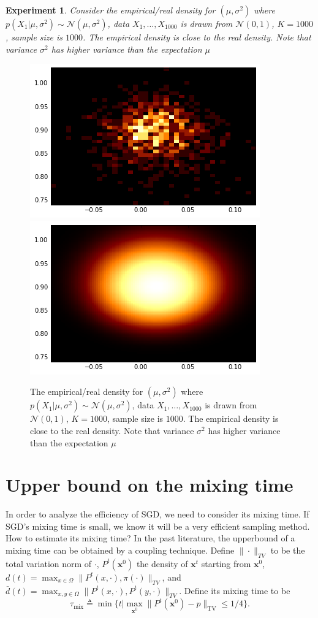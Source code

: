 \documentclass[preprint,12pt,3p]{elsarticle}
\newcommand{\bx}{\mathbf{x}}
\newcommand{\N}{\mathscr{N}}
\newtheorem{experiment}{Experiment}
\begin{document}
\begin{experiment}
Consider the empirical/real density for $(\mu, \sigma^2)$ where $p(X_1|\mu, \sigma^2)\sim \N(\mu, \sigma^2)$, data $X_1,\ldots, X_{1000}$ is drawn from $\N(0, 1)$, $K = 1000$, sample size is $1000$. The empirical density is close to the real density. Note that variance $\sigma^2$ has higher variance than the expectation $\mu$
\end{experiment}
\begin{figure}
\includegraphics[width=0.5\linewidth]{../figure/simulation2_empirical.png}
\includegraphics[width=0.5\linewidth]{../figure/simulation2_real.png}
\caption{The empirical/real density for $(\mu, \sigma^2)$ where $p(X_1|\mu, \sigma^2)\sim \N(\mu, \sigma^2)$, data $X_1,\ldots, X_{1000}$ is drawn from $\N(0, 1)$, $K = 1000$, sample size is $1000$. The empirical density is close to the real density. Note that variance $\sigma^2$ has higher variance than the expectation $\mu$}
\end{figure}
\section{Upper bound on the mixing time} %
\label{sec:upper_bound_on_the_mixing_time}
In order to analyze the efficiency of SGD, we need to consider its mixing time. If SGD's mixing time is small, we know it will be a very efficient sampling method. How to estimate its mixing time? In the past literature, the upperbound of a mixing time can be obtained by a coupling technique. Define $\|\cdot\|_{TV}$ to be the total variation norm of $\cdot$, $P^t(\bx^0)$ the density of $\bx^t$ starting from $\bx^0$, $d(t) = \max_{x\in \Omega} \|P^t(x, \cdot), \pi(\cdot)\|_{TV}$, and $\bar{d}(t) = \max_{x,y\in \Omega} \|P^t(x, \cdot), P^t(y,\cdot)\|_{TV}$. 
Define its mixing time to be 
\[
\tau_{\mathrm{mix}} \triangleq \min\{t|\max_{\bx^0}\|P^t(\bx^0) - p\|_{\mathrm{TV}}\leq 1/4\}.
\]
\end{document}
